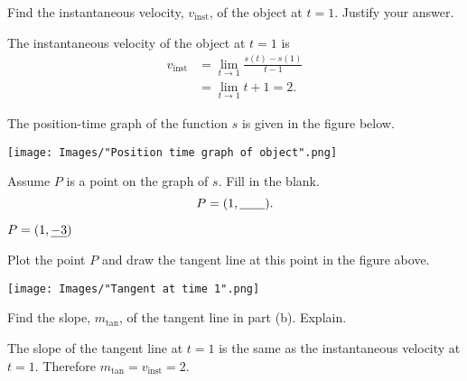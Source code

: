 \documentclass[nooutcomes]{ximera}
\renewenvironment{freeResponse}{
\ifhandout\setbox0\vbox\bgroup\else
\begin{trivlist}\item[\hskip \labelsep\bfseries Solution:\hspace{2ex}]
\fi}
{\ifhandout\egroup\else
\end{trivlist}
\fi}
\begin{document}
\begin{problem}
\begin{itemize}
    \item [(IV)]
      Find the instantaneous velocity, $v_{\mathrm{inst}}$, of the object at $t = 1$.
      Justify your answer.
      \begin{freeResponse}
        The instantaneous velocity of the object at $t = 1$ is
        \begin{align*}
          v_{\mathrm{inst}} &= \lim_{t \to 1} \frac{s(t) - s(1)}{t-1} \\
          &= \lim_{t \to 1} t+1 = 2.
        \end{align*}
      \end{freeResponse}


    \item[(V)]
      The position-time graph of the function $s$ is given in the figure below.
      \begin{image}
        \texttt{[image: Images/"Position time graph of object".png]}
      \end{image}
      \begin{itemize}
        \item[(a)]
          Assume $P$ is a point on the graph of $s$.
          Fill in the blank.
          \[
            P = (1, \mbox{\underline{\hspace{2em}}}).
          \]
          \begin{freeResponse}
            $P = (1, \mbox{\underline{$-3$}})$
          \end{freeResponse}


        \item[(b)]
          Plot the point $P$ and draw the tangent line at this point in the figure above.
          \begin{freeResponse}
            \begin{image}
              \texttt{[image: Images/"Tangent at time 1".png]}
            \end{image}
          \end{freeResponse}


        \item[(c)]
          Find the slope, $m_{\mathrm{tan}}$, of the tangent line in part (b).
          Explain.
          \begin{freeResponse}
            The slope of the tangent line at $t = 1$ is the same as the instantaneous velocity at $t = 1$.
            Therefore $m_{\mathrm{tan}} = v_{\mathrm{inst}} = 2$.
          \end{freeResponse}
      \end{itemize}


  \end{itemize}
\end{problem}
\end{document}
